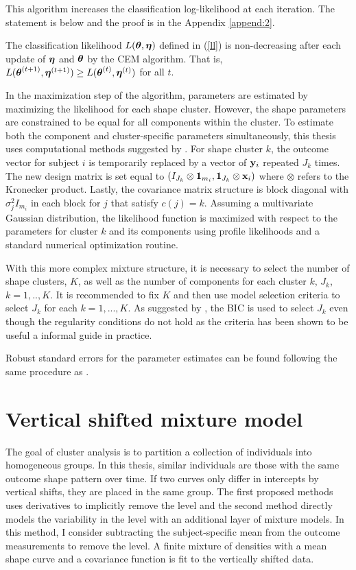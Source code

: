 This algorithm increases the classification log-likelihood at each iteration. The statement is below and the proof is in the Appendix \ref{append:2}. 
\begin{theorem}\label{Thm:CEM} The classification likelihood $L(\boldsymbol\theta,\boldsymbol\eta)$ defined in (\ref{ll}) is non-decreasing after each update of $\boldsymbol\eta$ and $\boldsymbol\theta$ by the CEM algorithm. That is, $L(\boldsymbol\theta^{(t+1)},\boldsymbol\eta^{(t+1)}) \geq L(\boldsymbol\theta^{(t)},\boldsymbol\eta^{(t)})$ for all $t$.
\end{theorem}

In the maximization step of the algorithm, parameters are estimated by maximizing the likelihood for each shape cluster. However, the shape parameters are constrained to be equal for all components within the cluster. To estimate both the component and cluster-specific parameters simultaneously, this thesis uses computational methods suggested by \textcite{grun2008}. For shape cluster $k$, the outcome vector for subject $i$ is temporarily replaced by a vector of $\mathbf y_{i}$ repeated $J_{k}$ times. The new design matrix  is set equal to $(I_{J_{k}}\otimes \boldsymbol 1_{m_{i}}, \boldsymbol 1_{J_{k}} \otimes \mathbf x_{i})$ where $\otimes$ refers to the Kronecker product. Lastly, the covariance matrix structure is block diagonal with $\sigma^{2}_{j}I_{m_{i}}$ in each block for $j$ that satisfy $c(j)=k$. Assuming a multivariate Gaussian distribution, the likelihood function is maximized with respect to the parameters for cluster $k$ and its components using profile likelihoods and a standard numerical optimization routine.

With this more complex mixture structure, it is necessary to select the number of shape clusters, $K$, as well as the number of components for each cluster $k$, $J_{k}$, $k=1,..,K$. It is recommended to fix $K$ and then use model selection criteria to select $J_{k}$ for each $k=1,...,K$. As suggested by \textcite{li2005}, the BIC is used to select $J_{k}$ even though the regularity conditions do not hold as the criteria has been shown to be useful a informal guide in practice.

Robust standard errors for the parameter estimates can be found following the same procedure as \textcite{boldea2009}.

\section{Vertical shifted mixture model}
The goal of cluster analysis is to partition a collection of individuals into homogeneous groups. In this thesis, similar individuals are those with the same outcome shape pattern over time. If two curves only differ in intercepts by vertical shifts, they are placed in the same group. The first proposed methods uses derivatives to implicitly remove the level and the second method directly models the variability in the level with an additional layer of mixture models.  In this method, I consider subtracting the subject-specific mean from the outcome measurements to remove the level. A finite mixture of densities with a mean shape curve and a covariance function is fit to the vertically shifted data. 

